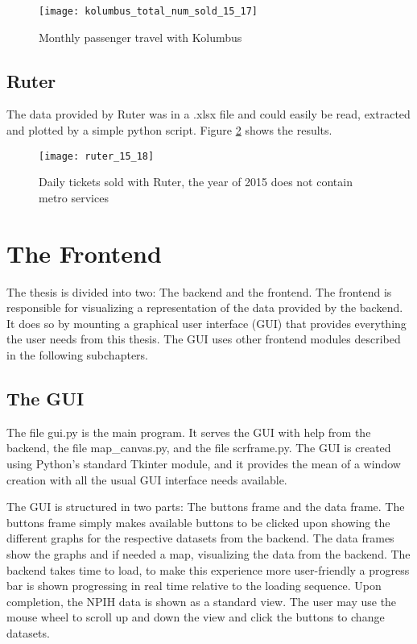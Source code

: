 \begin{figure}[ht]
\texttt{[image: kolumbus\_total\_num\_sold\_15\_17]}
\centering
\caption{Monthly passenger travel with Kolumbus}
\label{fig:kolumbus_15_17}
\end{figure}









\subsection{Ruter}
The data provided by Ruter was in a .xlsx file and could easily be read, extracted and plotted by a simple python script. Figure \ref{fig:ruter_15_18} shows the results.

\begin{figure}[ht]
\texttt{[image: ruter\_15\_18]}
\centering
\caption{Daily tickets sold with Ruter, the year of 2015 does not contain metro services}
\label{fig:ruter_15_18}
\end{figure}










\section{The Frontend}
The thesis is divided into two: The backend and the frontend. The frontend is responsible for visualizing a representation of the data provided by the backend. It does so by mounting a graphical user interface (GUI) that provides everything the user needs from this thesis. The GUI uses other frontend modules described in the following subchapters.

\subsection{The GUI}
The file gui.py is the main program. It serves the GUI with help from the backend, the file map\_canvas.py, and the file scrframe.py. The GUI is created using Python's standard Tkinter module, and it provides the mean of a window creation with all the usual GUI interface needs available. 

The GUI is structured in two parts: The buttons frame and the data frame. The buttons frame simply makes available buttons to be clicked upon showing the different graphs for the respective datasets from the backend. The data frames show the graphs and if needed a map, visualizing the data from the backend. The backend takes time to load, to make this experience more user-friendly a progress bar is shown progressing in real time relative to the loading sequence. Upon completion, the NPIH data is shown as a standard view. The user may use the mouse wheel to scroll up and down the view and click the buttons to change datasets. 

